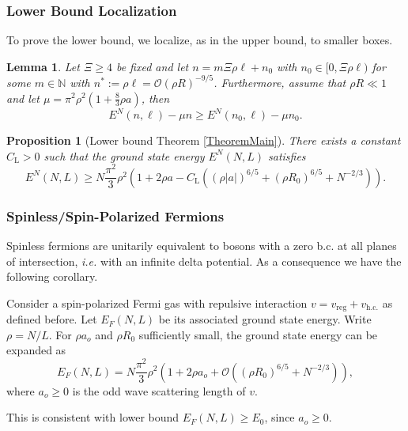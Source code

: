 \documentclass{beamer}[10]
\newcommand{\abs}[1]{\left\lvert #1 \right\rvert}
\newcommand{\ie}{\emph{i.e.} }
\newtheorem{mproposition}{Proposition}
\newtheorem{mlemma}{Lemma}
\begin{document}
\begin{frame}
	\frametitle{Lower Bound Localization}
	\begin{block}{}
	\small	To prove the lower bound, we localize, as in the upper bound, to smaller boxes.
		\begin{mlemma}\label{LemmaLocalizationFbound}
			Let $ \Xi\geq 4 $ be fixed and let $ n=m\Xi \rho \ell+n_0 $ with $ n_0\in[0,\Xi\rho \ell) $ for some $ m\in\mathbb{N} $ with $ n^{\ast}:=\rho\ell=\mathcal{O}(\rho R)^{-9/5} $. Furthermore, assume that $ \rho R\ll 1 $ and let $ \mu=\pi^2\rho^2\left(1+\frac{8}{3}\rho a\right) $, then \begin{equation}
			E^{N}(n,\ell)-\mu n \geq E^{N}(n_0,\ell)-\mu n_0.
			\end{equation}
		\end{mlemma}
		\begin{mproposition}[Lower bound Theorem \ref{TheoremMain}]
			\label{PropositionLowerBound}
			There exists a constant $C_\text{L}>0$ such that the ground state energy $E^N(N,L)$ satisfies
			\begin{equation}
			\label{eqlower}
			E^N(N,L)\geq N\frac{\pi^2}{3}\rho^2\left(1+2\rho a-C_\text{L}\left((\rho\abs{a})^{6/5}+(\rho R_0)^{6/5}+N^{-2/3}\right)\right).
			\end{equation}
		\end{mproposition}
	\end{block}	
\end{frame}
\begin{frame}
	\frametitle{Spinless/Spin-Polarized Fermions}
	Spinless fermions are unitarily equivalent to bosons with a zero b.c. at all planes of intersection, \ie with an infinite delta potential. As a consequence we have the following corollary. 
	\begin{theorem}\label{TheoremFermion}
		Consider a spin-polarized Fermi gas with repulsive interaction  $v=v_{\text{reg}}+v_{\text{h.c.}}$ as defined before. Let $ E_F(N,L)$ be its associated ground state energy. Write $\rho=N/L$. For $\rho a_o$ and $\rho R_0$ sufficiently small, the ground state energy can be expanded as 
		\begin{equation}
		E_F(N,L)=N\frac{\pi^2}{3}\rho^2\left(1+2\rho a_o+\mathcal{O}\left(\left(\rho R_0\right)^{6/5}+N^{-2/3}\right)\right),
		\end{equation}
		where $ a_o\geq0 $ is the odd wave scattering length of $v$. 
	\end{theorem} 
	This is consistent with lower bound $ E_F(N,L)\geq E_0 $, since $ a_o\geq 0 $.
\end{frame}
\end{document}
